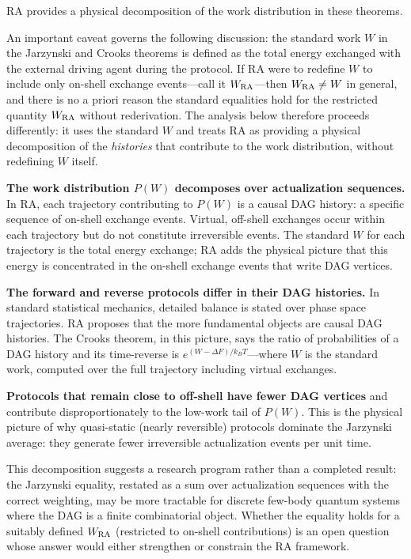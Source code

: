 \documentclass[11pt,a4paper]{article}
\theoremstyle{plain}
\theoremstyle{definition}
\theoremstyle{remark}
\begin{document}
RA provides a physical decomposition of the work distribution in these theorems.

An important caveat governs the following discussion: the standard work $W$ in the
Jarzynski and Crooks theorems is defined as the total energy exchanged with the
external driving agent during the protocol. If RA were to redefine $W$ to include
only on-shell exchange events---call it $W_{\rm RA}$---then $W_{\rm RA} \neq W$
in general, and there is no a priori reason the standard equalities hold for the
restricted quantity $W_{\rm RA}$ without rederivation. The analysis below therefore
proceeds differently: it uses the standard $W$ and treats RA as providing a
physical decomposition of the \emph{histories} that contribute to the work
distribution, without redefining $W$ itself.

\textbf{The work distribution $P(W)$ decomposes over actualization sequences.}
In RA, each trajectory contributing to $P(W)$ is a causal DAG history: a specific
sequence of on-shell exchange events. Virtual, off-shell exchanges occur within
each trajectory but do not constitute irreversible events. The standard $W$ for
each trajectory is the total energy exchange; RA adds the physical picture that
this energy is concentrated in the on-shell exchange events that write DAG vertices.

\textbf{The forward and reverse protocols differ in their DAG histories.}
In standard statistical mechanics, detailed balance is stated over phase space
trajectories. RA proposes that the more fundamental objects are causal DAG
histories. The Crooks theorem, in this picture, says the ratio of probabilities
of a DAG history and its time-reverse is $e^{(W-\Delta F)/k_BT}$---where $W$ is
the standard work, computed over the full trajectory including virtual exchanges.

\textbf{Protocols that remain close to off-shell have fewer DAG vertices} and
contribute disproportionately to the low-work tail of $P(W)$. This is the physical
picture of why quasi-static (nearly reversible) protocols dominate the Jarzynski
average: they generate fewer irreversible actualization events per unit time.

This decomposition suggests a research program rather than a completed result: the
Jarzynski equality, restated as a sum over actualization sequences with the correct
weighting, may be more tractable for discrete few-body quantum systems where the
DAG is a finite combinatorial object. Whether the equality holds for a
suitably defined $W_{\rm RA}$ (restricted to on-shell contributions) is an open
question whose answer would either strengthen or constrain the RA framework.
\end{document}
